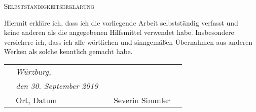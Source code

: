 \begin{center}
  \textsc{Selbstständigkeitserklärung}
\end{center}

\noindent Hiermit erkläre ich, dass ich die vorliegende Arbeit selbstständig verfasst und keine anderen als die angegebenen Hilfsmittel verwendet habe. Insbesondere versichere ich, dass ich alle wörtlichen und sinngemäßen Übernahmen aus anderen Werken als solche kenntlich gemacht habe.
\vspace{3cm}

\begin{tabular}{p{10mm}>{\centering\arraybackslash}p{50mm}p{10mm}
>{\centering\arraybackslash}p{50mm}p{10mm}}
&\textit{\large Würzburg,}&&& \\
&\textit{\large den 30. September 2019}&&\hrulefill& \\
&\small Ort, Datum&&\small Severin Simmler&
\end{tabular}
